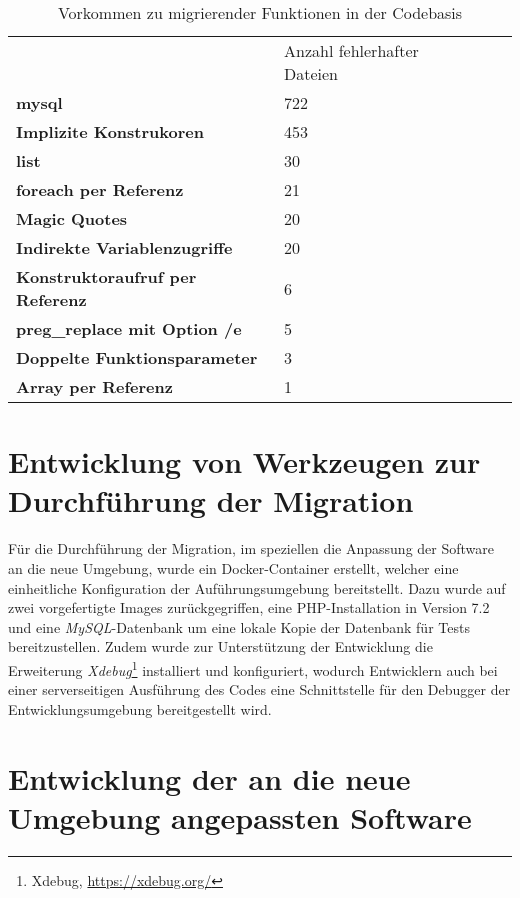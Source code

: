 \begin{table}
    \centering
    \caption{Vorkommen zu migrierender Funktionen in der Codebasis}
    \label{tab:migrationFunctions}
    \begin{tabular}{llll}
                                            & Anzahl fehlerhafter Dateien \\
    \textbf{mysql}                          & 722   \\
    \textbf{Implizite Konstrukoren}         & 453 \\
    \textbf{list}                           & 30 \\
    \textbf{foreach per Referenz}           & 21 \\
    \textbf{Magic Quotes}                   & 20 \\
    \textbf{Indirekte Variablenzugriffe}    & 20 \\
    \textbf{Konstruktoraufruf per Referenz} & 6 \\
    \textbf{preg\_replace mit Option /e}    & 5 \\
    \textbf{Doppelte Funktionsparameter}    & 3 \\    
    \textbf{Array per Referenz}             & 1 \\
    \end{tabular}
\end{table}

\section{Entwicklung von Werkzeugen zur Durchführung der Migration}
Für die Durchführung der Migration, im speziellen die Anpassung der Software an die neue Umgebung, wurde ein Docker-Container 
erstellt, welcher eine einheitliche Konfiguration der Auführungsumgebung bereitstellt. Dazu wurde auf zwei vorgefertigte 
Images zurückgegriffen, eine \ac{PHP}-Installation in Version 7.2 und eine \textit{MySQL}-Datenbank um eine lokale Kopie 
der Datenbank für Tests bereitzustellen. Zudem wurde zur Unterstützung der Entwicklung die Erweiterung \textit{Xdebug}\footnote{Xdebug, \url{https://xdebug.org/}} 
installiert und konfiguriert, wodurch Entwicklern auch bei einer serverseitigen Ausführung des Codes eine Schnittstelle 
für den Debugger der Entwicklungsumgebung bereitgestellt wird.

\section{Entwicklung der an die neue Umgebung angepassten Software}

